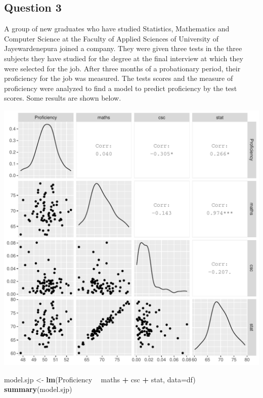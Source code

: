 \documentclass[]{article}
\newenvironment{Shaded}{\begin{snugshade}}{\end{snugshade}}
\newcommand{\DataTypeTok}[1]{\textcolor[rgb]{0.13,0.29,0.53}{#1}}
\newcommand{\KeywordTok}[1]{\textcolor[rgb]{0.13,0.29,0.53}{\textbf{#1}}}
\newcommand{\NormalTok}[1]{#1}
\newcommand{\OperatorTok}[1]{\textcolor[rgb]{0.81,0.36,0.00}{\textbf{#1}}}
\newcommand{\StringTok}[1]{\textcolor[rgb]{0.31,0.60,0.02}{#1}}
\begin{document}
\hypertarget{question-3}{%
\subsection{Question 3}\label{question-3}}

A group of new graduates who have studied Statistics, Mathematics and
Computer Science at the Faculty of Applied Sciences of University of
Jayewardenepura joined a company. They were given three tests in the
three subjects they have studied for the degree at the final interview
at which they were selected for the job. After three months of a
probationary period, their proficiency for the job was measured. The
tests scores and the measure of proficiency were analyzed to find a
model to predict proficiency by the test scores. Some results are shown
below.

\includegraphics{modelquestions_files/figure-latex/unnamed-chunk-7-1.pdf}

\begin{Shaded}
\begin{Highlighting}[]
\NormalTok{model.sjp <-}\StringTok{ }\KeywordTok{lm}\NormalTok{(Proficiency }\OperatorTok{~}\StringTok{ }\NormalTok{maths }\OperatorTok{+}\StringTok{ }\NormalTok{csc }\OperatorTok{+}\StringTok{ }\NormalTok{stat, }\DataTypeTok{data=}\NormalTok{df)}
\KeywordTok{summary}\NormalTok{(model.sjp)}
\end{Highlighting}
\end{Shaded}
\end{document}
